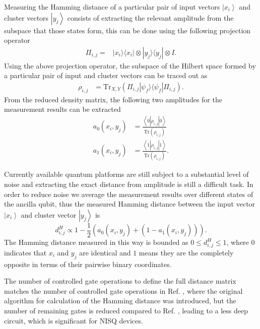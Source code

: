 \documentclass[%
  pra, aps, physrev,
  showkeys,
  twocolumn,
  showpacs,
  superscriptaddress,
  amsmath,amssymb,
  10pt
]{revtex4-2}
\begin{document}
Measuring the Hamming distance of a particular pair of input vectors $\left| x_i \right\rangle$ and cluster vectors $\left| y_j \right\rangle$ consists of extracting the relevant amplitude from the subspace that those states form,
this can be done using the following projection operator
%
\begin{align}
\Pi_{i,j} = &\left| x_i \rangle\langle x_i \right| \otimes \left| y_j \rangle\langle y_j \right| \otimes I .
\end{align}
%
Using the above projection operator, the subspace of the Hilbert space formed by a particular pair of input and cluster vectors can be traced out as
%
\begin{align}
    \rho_{i,j} &= \text{Tr}_{X,Y} (\Pi_{i,j} \left| \psi_f \rangle\langle \psi_f \right| \Pi_{i,j}) .
\end{align}
%
From the reduced density matrix, the following two amplitudes for the measurement results can be extracted
%
\begin{align}
    a_0(x_i,y_j) & = \frac{\left\langle 0 |\rho_{i,j}| 0 \right\rangle}{\text{Tr}(\rho_{i,j})}  \\
    a_1(x_i,y_j) & = \frac{\left\langle 1 |\rho_{i,j}| 1 \right\rangle}{\text{Tr}(\rho_{i,j})} .
\end{align}
%






Currently available quantum platforms are still subject to a substantial level of noise and extracting the exact distance from amplitude is still a difficult task. In order to reduce noise we average the measurement results over different states of the ancilla qubit, thus the measured Hamming distance between the input vector $\left| x_i \right\rangle$ and cluster vector $\left| y_j \right\rangle$ is
%
\begin{equation}\label{eq:amplitudes2distance}
    d_{i,j}^H \propto 1 - \frac{1}{2}(a_0(x_i,y_j) + (1-a_1(x_i,y_j))).
\end{equation}
%
The Hamming distance measured in this way is bounded as $0 \leq d_{i,j}^H \leq 1$,
where  $0$ indicates that $x_i$ and $y_j$ are identical and $1$ means they are the completely opposite in terms of their pairwise binary coordinates.

The number of controlled gate operations to define the full distance matrix matches the number of controlled gate operations in Ref. \cite{trugenberger2001}, where the original algorithm for calculation of the Hamming distance was introduced, but the number of remaining gates is reduced compared to Ref. \cite{trugenberger2001}, leading to a less deep circuit, which is significant for NISQ devices.
\end{document}
